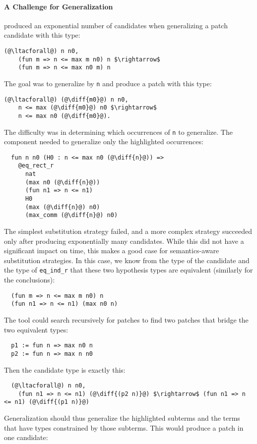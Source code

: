 \paragraph{A Challenge for Generalization}  produced an exponential number of candidates when generalizing a patch candidate with this type:

\begin{lstlisting}[language=coq]
  (@\ltacforall@) n n0,
    (fun m => n <= max m n0) n $\rightarrow$
    (fun m => n <= max n0 m) n
\end{lstlisting}
The goal was to generalize by \lstinline{n} and produce a patch with this type:

\begin{lstlisting}[language=coq]
  (@\ltacforall@) (@\diff{m0}@) n n0,
    n <= max (@\diff{m0}@) n0 $\rightarrow$
    n <= max n0 (@\diff{m0}@).
\end{lstlisting}
The difficulty was in determining which occurrences of \lstinline{n} to generalize.
The component needed to generalize only the highlighted occurrences:

\begin{lstlisting}
  fun n n0 (H0 : n <= max n0 (@\diff{n}@)) =>
    @eq_rect_r
      nat
      (max n0 (@\diff{n}@))
      (fun n1 => n <= n1)
      H0
      (max (@\diff{n}@) n0)
      (max_comm (@\diff{n}@) n0)
\end{lstlisting}
The simplest substitution strategy failed, and a more
complex strategy
succeeded only after producing exponentially many candidates.
While this did not have a significant impact on time,
this makes a good case for semantics-aware substitution strategies.
In this case, we know from the type of the candidate
and the type of \lstinline{eq_ind_r} that these two hypothesis types 
are equivalent (similarly for the conclusions):

\begin{lstlisting}
  (fun m => n <= max m n0) n
  (fun n1 => n <= n1) (max n0 n)
\end{lstlisting}
The tool could search recursively for patches to find two patches that bridge the two equivalent
types:

\begin{lstlisting}
  p1 := fun n => max n0 n
  p2 := fun n => max n n0
\end{lstlisting}
Then the candidate type is exactly this:

\begin{lstlisting}
  (@\ltacforall@) n n0,
    (fun n1 => n <= n1) (@\diff{(p2 n)}@) $\rightarrow$ (fun n1 => n <= n1) (@\diff{(p1 n)}@)
\end{lstlisting}
Generalization should thus generalize the highlighted subterms and the
terms that have types constrained by those subterms.
This would produce a patch in one candidate:

